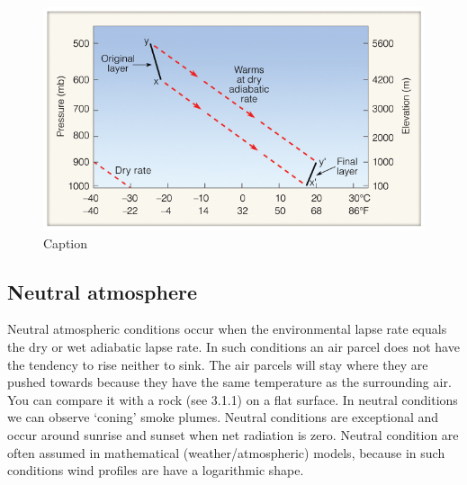 \documentclass[12pt,oneside]{book}
\begin{document}
\begin{figure}

{\centering \includegraphics[width=0.8\linewidth]{figures/Figure36} 

}

\caption{Caption}\label{fig:adiabatic}
\end{figure}

\subsection{Neutral atmosphere}\label{neutral-atmosphere}

Neutral atmospheric conditions occur when the environmental lapse rate
equals the dry or wet adiabatic lapse rate. In such conditions an air
parcel does not have the tendency to rise neither to sink. The air
parcels will stay where they are pushed towards because they have the
same temperature as the surrounding air. You can compare it with a rock
(see 3.1.1) on a flat surface. In neutral conditions we can observe
`coning' smoke plumes. Neutral conditions are exceptional and occur
around sunrise and sunset when net radiation is zero. Neutral condition
are often assumed in mathematical (weather/atmospheric) models, because
in such conditions wind profiles are have a logarithmic shape.
\end{document}
